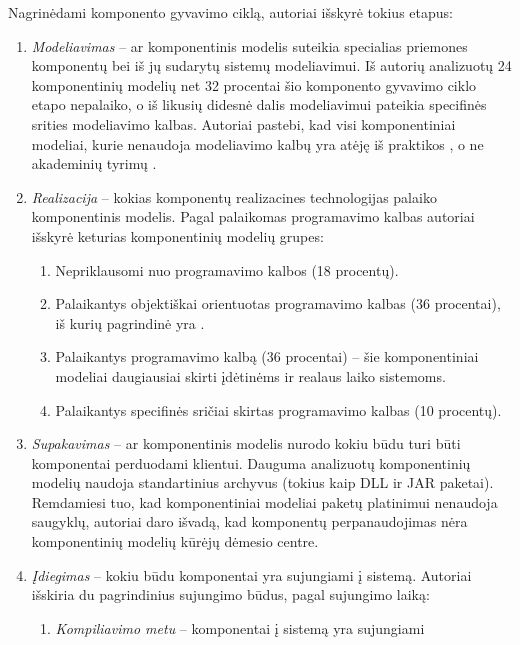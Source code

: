 Nagrinėdami komponento gyvavimo ciklą, autoriai išskyrė tokius
etapus:
\begin{enumerate}
  \item \emph{Modeliavimas} – ar komponentinis modelis suteikia
    specialias priemones komponentų bei iš jų sudarytų sistemų
    modeliavimui. Iš autorių analizuotų 24 komponentinių modelių net
    32 procentai šio komponento gyvavimo ciklo etapo nepalaiko,
    o iš likusių didesnė dalis modeliavimui pateikia specifinės
    srities  modeliavimo kalbas. Autoriai
    pastebi, kad visi komponentiniai modeliai, kurie nenaudoja
    modeliavimo kalbų yra atėję iš praktikos , o ne akademinių tyrimų 
    \cite[604]{classification-framework-for-scm}.
  \item \emph{Realizacija} – kokias komponentų realizacines technologijas
    palaiko komponentinis modelis. Pagal palaikomas programavimo kalbas
    autoriai išskyrė keturias komponentinių modelių grupes:
    \begin{enumerate}
      \item Nepriklausomi nuo programavimo kalbos (18 procentų).
      \item Palaikantys objektiškai orientuotas programavimo kalbas
        (36 procentai), iš kurių pagrindinė yra .
      \item Palaikantys  programavimo kalbą (36 procentai)
        – šie komponentiniai modeliai daugiausiai skirti įdėtinėms
         ir realaus laiko sistemoms.
      \item Palaikantys specifinės sričiai  skirtas
        programavimo kalbas (10 procentų).
    \end{enumerate}
  \item \emph{Supakavimas} – ar komponentinis modelis nurodo kokiu
    būdu turi būti komponentai perduodami klientui. Dauguma
    analizuotų komponentinių modelių naudoja standartinius archyvus
    (tokius kaip DLL ir JAR paketai). Remdamiesi tuo, kad komponentiniai
    modeliai paketų platinimui nenaudoja saugyklų, autoriai daro
    išvadą, kad komponentų perpanaudojimas nėra komponentinių
    modelių kūrėjų dėmesio centre.
  \item \emph{Įdiegimas} – kokiu būdu komponentai yra sujungiami į sistemą.
    Autoriai išskiria du pagrindinius sujungimo būdus, pagal
    sujungimo laiką:
    \begin{enumerate}
      \item \emph{Kompiliavimo metu} – komponentai į sistemą yra sujungiami

\end{enumerate}
\end{enumerate}
